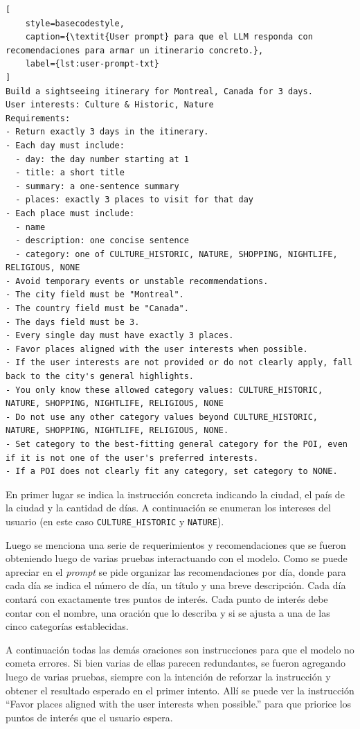 \begin{lstlisting}[
    style=basecodestyle,
    caption={\textit{User prompt} para que el LLM responda con recomendaciones para armar un itinerario concreto.},
    label={lst:user-prompt-txt}
]
Build a sightseeing itinerary for Montreal, Canada for 3 days.
User interests: Culture & Historic, Nature
Requirements:
- Return exactly 3 days in the itinerary.
- Each day must include:
  - day: the day number starting at 1
  - title: a short title
  - summary: a one-sentence summary
  - places: exactly 3 places to visit for that day
- Each place must include:
  - name
  - description: one concise sentence
  - category: one of CULTURE_HISTORIC, NATURE, SHOPPING, NIGHTLIFE, RELIGIOUS, NONE
- Avoid temporary events or unstable recommendations.
- The city field must be "Montreal".
- The country field must be "Canada".
- The days field must be 3.
- Every single day must have exactly 3 places.
- Favor places aligned with the user interests when possible.
- If the user interests are not provided or do not clearly apply, fall back to the city's general highlights.
- You only know these allowed category values: CULTURE_HISTORIC, NATURE, SHOPPING, NIGHTLIFE, RELIGIOUS, NONE
- Do not use any other category values beyond CULTURE_HISTORIC, NATURE, SHOPPING, NIGHTLIFE, RELIGIOUS, NONE.
- Set category to the best-fitting general category for the POI, even if it is not one of the user's preferred interests.
- If a POI does not clearly fit any category, set category to NONE.
\end{lstlisting}

En primer lugar se indica la instrucción concreta indicando la ciudad, el país de la ciudad y la cantidad de días.
A continuación se enumeran los intereses del usuario (en este caso \texttt{CULTURE\_HISTORIC} y \texttt{NATURE}).

Luego se menciona una serie de requerimientos y recomendaciones que se fueron obteniendo luego de varias pruebas
interactuando con el modelo.
Como se puede apreciar en el \textit{prompt} se pide organizar las recomendaciones por día, donde para cada día se
indica el número de día, un título y una breve descripción.
Cada día contará con exactamente tres puntos de interés.
Cada punto de interés debe contar con el nombre, una oración que lo describa y si se ajusta a una de las cinco
categorías establecidas.

A continuación todas las demás oraciones son instrucciones para que el modelo no cometa errores.
Si bien varias de ellas parecen redundantes, se fueron agregando luego de varias pruebas, siempre con la intención de
reforzar la instrucción y obtener el resultado esperado en el primer intento.
Allí se puede ver la instrucción \enquote{Favor places aligned with the user interests when possible.} para que priorice los
puntos de interés que el usuario espera.


